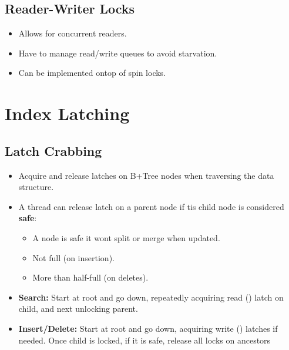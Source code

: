 \documentclass[11pt]{article}
\begin{document}
\subsection*{Reader-Writer Locks}
\begin{itemize}
    \item
    Allows for concurrent readers.
    
    \item
    Have to manage read/write queues to avoid starvation.
    
    \item
    Can be implemented ontop of spin locks.
\end{itemize}

\section{Index Latching}

\subsection*{Latch Crabbing}
\begin{itemize}
    \item
    Acquire and release latches on B+Tree nodes when traversing the data structure.
    
    \item
    A thread can release latch on a parent node if tis child node is considered \textbf{safe}:
    \begin{itemize}
        \item
        A node is safe it wont split or merge when updated.
        
        \item
        Not full (on insertion).
        
        \item
        More than half-full (on deletes).
    \end{itemize}
    
    \item \textbf{Search:}
    Start at root and go down, repeatedly acquiring read () latch on child, 
    and next unlocking parent.
    
    \item \textbf{Insert/Delete:}
    Start at root and go down, acquiring write () latches if 
    needed. Once child is locked, if it is safe, release all locks on ancestors
\end{itemize}
\end{document}
